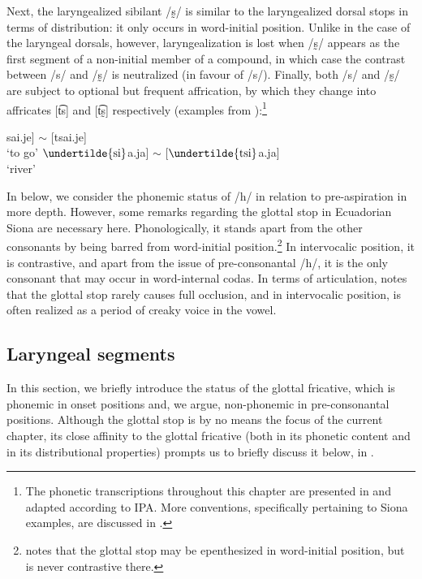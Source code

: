 \documentclass[output=paper]{langscibook}
\begin{document}
Next, the laryngealized sibilant \mbox{/s̰/} is similar to the laryngealized dorsal stops in terms of distribution: it only occurs in word-initial position. Unlike in the case of the laryngeal dorsals, however, laryngealization is lost when /s̰/ appears as the first segment of a non-initial member of a compound, in which case the contrast between /s/ and /s̰/ is neutralized (in favour of /s/). Finally, both /s/ and /s̰/ are subject to optional but frequent affrication, by which they change into affricates [t͡s] and [t͡s̰] respectively (examples from \citealt[100]{Bruil:2014}):\footnote{The phonetic transcriptions throughout this chapter are presented in and adapted according to IPA. More conventions, specifically pertaining to Siona examples, are discussed in .}

\begin{exe}
\ex\label{exe-lar-sibfort}
\begin{xlist}
	\ex {[}sai.je] $\sim$ [tsai.je]\\`to go'
	\ex {[}$\undertilde{\mathrm{si}}$a.ja] $\sim$ [$\undertilde{\mathrm{tsi}}$a.ja]\\`river'
\end{xlist}
\end{exe}

In  below, we consider the phonemic status of /h/ in relation to pre-aspiration in more depth. However, some remarks regarding the glottal stop in Ecuadorian Siona are necessary here. Phonologically, it stands apart from the other consonants by being barred from word-initial position.\footnote{\citet[95]{Bruil:2014} notes that the glottal stop may be epenthesized in word-initial position, but is never contrastive there.} In intervocalic position, it is contrastive, and apart from the issue of pre-consonantal /h/, it is the only consonant that may occur in word-internal codas. In terms of articulation, \citet{Bruil:2014} notes that the glottal stop rarely causes full occlusion, and in intervocalic position, is often realized as a period of creaky voice in the vowel. 

\subsection{Laryngeal segments}
In this section, we briefly introduce the status of the glottal fricative, which is phonemic in onset positions and, we argue, non-phonemic in pre-consonantal positions. Although the glottal stop is by no means the focus of the current chapter, its close affinity to the glottal fricative (both in its phonetic content and in its distributional properties) prompts us to briefly discuss it below, in .
\end{document}

